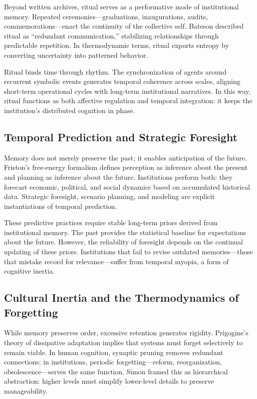 \documentclass[11pt,a4paper]{article}
\begin{document}
Beyond written archives, ritual serves as a performative mode of institutional memory.  Repeated ceremonies—graduations, inaugurations, audits, commemorations—enact the continuity of the collective self.  Bateson \citep{Bateson1972StepsToAnEcologyOfMind} described ritual as “redundant communication,” stabilizing relationships through predictable repetition.  In thermodynamic terms, ritual exports entropy by converting uncertainty into patterned behavior.  

Ritual binds time through rhythm.  The synchronization of agents around recurrent symbolic events generates temporal coherence across scales, aligning short-term operational cycles with long-term institutional narratives.  In this way, ritual functions as both affective regulation and temporal integration: it keeps the institution’s distributed cognition in phase.

\subsection{Temporal Prediction and Strategic Foresight}

Memory does not merely preserve the past; it enables anticipation of the future.  Friston’s free-energy formalism \citep{Friston2013LifeAsWeKnowIt} defines perception as inference about the present and planning as inference about the future.  Institutions perform both: they forecast economic, political, and social dynamics based on accumulated historical data.  Strategic foresight, scenario planning, and modeling are explicit instantiations of temporal prediction.

These predictive practices require stable long-term priors derived from institutional memory.  The past provides the statistical baseline for expectations about the future.  However, the reliability of foresight depends on the continual updating of these priors.  Institutions that fail to revise outdated memories—those that mistake record for relevance—suffer from temporal myopia, a form of cognitive inertia.

\subsection{Cultural Inertia and the Thermodynamics of Forgetting}

While memory preserves order, excessive retention generates rigidity.  Prigogine’s theory of dissipative adaptation implies that systems must forget selectively to remain viable.  In human cognition, synaptic pruning removes redundant connections; in institutions, periodic forgetting—reform, reorganization, obsolescence—serves the same function.  Simon \citep{Simon1962ArchitectureComplexity} framed this as hierarchical abstraction: higher levels must simplify lower-level details to preserve manageability.
\end{document}

